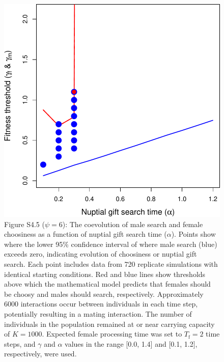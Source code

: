 \documentclass[
]{article}
\begin{document}
\clearpage

\captionsetup{labelformat=empty}

\begin{figure}
\centering
\includegraphics{ms_refs_fixed_files/figure-latex/unnamed-chunk-11-1.pdf}
\caption{Figure S4.5 (\(\psi = 6\)): The coevolution of male search and
female choosiness as a function of nuptial gift search time
(\(\alpha\)). Points show where the lower 95\% confidence interval of
where male search (blue) exceeds zero, indicating evolution of
choosiness or nuptial gift search. Each point includes data from 720
replicate simulations with identical starting conditions. Red and blue
lines show thresholds above which the mathematical model predicts that
females should be choosy and males should search, respectively.
Approximately 6000 interactions occur between individuals in each time
step, potentially resulting in a mating interaction. The number of
individuals in the population remained at or near carrying capacity of
\(K = 1000\). Expected female processing time was set to
\(T_{\mathrm{f}}=2\) time steps, and \(\gamma\) and \(\alpha\) values in
the range {[}0.0, 1.4{]} and {[}0.1, 1.2{]}, respectively, were used.}
\end{figure}

\captionsetup{labelformat=default}

\clearpage
\end{document}
